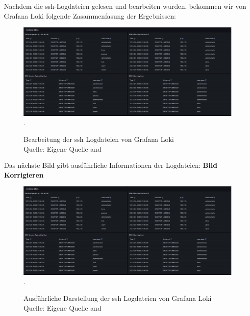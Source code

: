 \newpage
\thispagestyle{lscape}
\begin{landscape}
   Nachdem die \gls{ssh}-Logdateien gelesen und bearbeiten wurden, bekommen wir von Grafana Loki folgende Zasammenfasung der Ergebnissen:
   \begin{center}
      \begin{figure}[H]
         \centering
         \includegraphics[width=1.3\textwidth]{assets/GrafanaLoki_sshDetailed.png}.
         \caption{Bearbeitung der \gls{ssh} Logdateien von Grafana Loki\\Quelle: Eigene Quelle and \citep{VoidQuark_sshlogs}}
         \centering
      \end{figure}
   \end{center}
\end{landscape}

\newpage
\thispagestyle{lscape}
\begin{landscape}
   Das nächste Bild gibt ausführliche Informationen der Logdateien:
   \textbf{Bild Korrigieren}
   \begin{center}
      \begin{figure}[H]
         \centering
         \includegraphics[width=1.3\textwidth]{assets/GrafanaLoki_sshDetailed.png}.
         \caption{Ausführliche Darstellung der \gls{ssh} Logdateien von Grafana Loki\\Quelle: Eigene Quelle and \citep{VoidQuark_sshlogs}}
         \centering
      \end{figure}
   \end{center}
\end{landscape}

